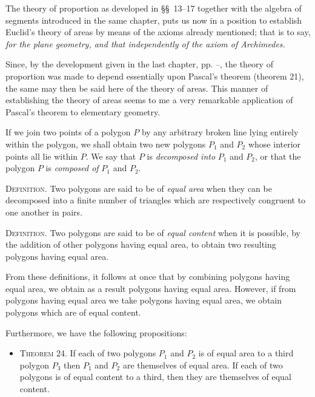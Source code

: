 \documentclass[11pt,oneside]{book}
\begin{document}
The theory of proportion as developed in \S\S~13--17
together with the algebra of segments introduced in
the same chapter, puts us now in a position to establish
Euclid's theory of areas by means of the axioms
already mentioned; that is to say, \emph{for the plane geometry,
and that independently of the axiom of Archimedes.}

Since, by the development given in the last chapter,
pp. \pageref{folio37}--\pageref{folio56}, the theory of proportion was made to depend
essentially upon Pascal's theorem (theorem 21),
the same may then be said here of the theory of areas.
This manner of establishing the theory of areas seems
to me a very remarkable application of Pascal's theorem
to elementary geometry.

If we join two points of a polygon $P$ by any arbitrary
broken line lying entirely within the polygon,
we shall obtain two new polygons $P_1$ and $P_2$ whose
interior points all lie within $P$. We say that $P$ is \textit{decomposed
into} $P_1$ and $P_2$, or that the polygon $P$ is \textit{composed
of} $P_1$ and $P_2$.

{\scshape Definition.} Two polygons are said to be of \textit{equal
area} when they can be decomposed into a finite number
of triangles which are respectively congruent to
one another in pairs.

{\scshape Definition.} Two polygons are said to be of \textit{equal
content} when it is possible, by the addition of other
polygons having equal area, to obtain two resulting
polygons having equal area.

From these definitions, it follows at once that by
combining polygons having equal area, we obtain as
a result polygons having equal area. However, if
from polygons having equal area we take polygons
having equal area, we obtain polygons which are of
equal content.

Furthermore, we have the following propositions:

\begin{itemize}
\item[ ] {\scshape Theorem 24.} If each of two polygons $P_1$ and $P_2$
is of equal area to a third polygon $P_3$ then $P_1$
and $P_2$ are themselves of equal area. If each
of two polygons is of equal content to a third,
then they are themselves of equal content.
\end{itemize}
\end{document}
